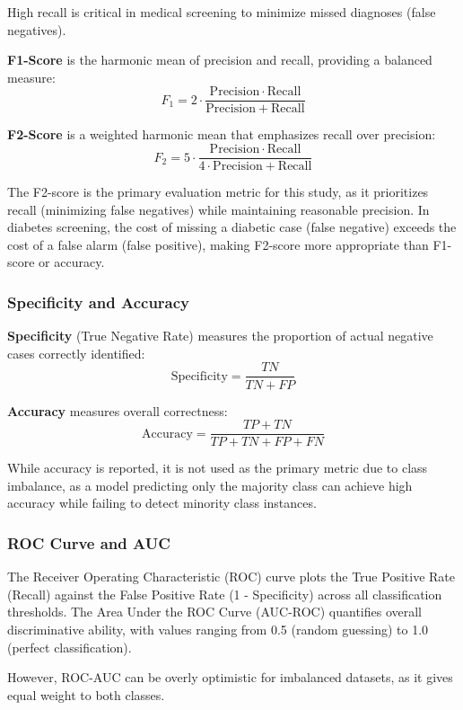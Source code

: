 High recall is critical in medical screening to minimize missed diagnoses (false negatives).

\textbf{F1-Score} is the harmonic mean of precision and recall, providing a balanced measure:
$$F_1 = 2 \cdot \frac{\mathrm{Precision} \cdot \mathrm{Recall}}{\mathrm{Precision} + \mathrm{Recall}}$$

\textbf{F2-Score} is a weighted harmonic mean that emphasizes recall over precision:
$$F_2 = 5 \cdot \frac{\mathrm{Precision} \cdot \mathrm{Recall}}{4 \cdot \mathrm{Precision} + \mathrm{Recall}}$$

The F2-score is the primary evaluation metric for this study, as it prioritizes recall (minimizing false negatives) while maintaining reasonable precision. In diabetes screening, the cost of missing a diabetic case (false negative) exceeds the cost of a false alarm (false positive), making F2-score more appropriate than F1-score or accuracy.

\subsubsection{Specificity and Accuracy}

\textbf{Specificity} (True Negative Rate) measures the proportion of actual negative cases correctly identified:
$$\mathrm{Specificity} = \frac{TN}{TN + FP}$$

\textbf{Accuracy} measures overall correctness:
$$\mathrm{Accuracy} = \frac{TP + TN}{TP + TN + FP + FN}$$

While accuracy is reported, it is not used as the primary metric due to class imbalance, as a model predicting only the majority class can achieve high accuracy while failing to detect minority class instances.

\subsubsection{ROC Curve and AUC}

The Receiver Operating Characteristic (ROC) curve plots the True Positive Rate (Recall) against the False Positive Rate (1 - Specificity) across all classification thresholds. The Area Under the ROC Curve (AUC-ROC) quantifies overall discriminative ability, with values ranging from 0.5 (random guessing) to 1.0 (perfect classification).

However, ROC-AUC can be overly optimistic for imbalanced datasets, as it gives equal weight to both classes.

